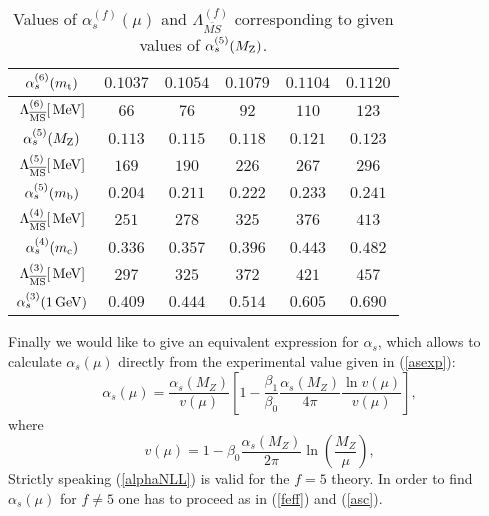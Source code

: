 \documentclass[12pt,rotate]{article}
\def\as{\alpha_s}
\newcommand{\mt}{m_{\rm t}}
\newcommand{\mc}{m_{\rm c}}
\newcommand{\mb}{m_{\rm b}}
\newcommand{\mz}{M_{\rm Z}}
\newcommand{\gev}{\, {\rm GeV}}
\newcommand{\mev}{\, {\rm MeV}}
\newcommand{\Lms}{\Lambda_{\overline{\rm MS}}}
\newcommand{\be}{\begin{equation}}
\newcommand{\ee}{\end{equation}}
\newcommand{\f}{\frac}
\begin{document}
\begin{itemize}
\begin{itemize}
\begin{table}[thb]
\caption[]{Values of $\alpha^{(f)}_s(\mu)$ and
$\Lambda^{(f)}_{\overline{MS}}$ corresponding to given values of
$\alpha_s^{(5)}(\mz)$.
\label{tab:alphas}}
\begin{center}
\begin{tabular}{|c|c|c|c|c|c|}\hline
 $\alpha_s^{(6)}(\mt)$& $0.1037$& $0.1054$& $0.1079$ & $0.1104$ &  $0.1120$ 
\\ \hline
 $\Lms^{(6)}[\mev]$& $66$& $76$& $92$ & $110$ &  $123$ 
\\ \hline\hline
 $\alpha_s^{(5)}(\mz)$& $0.113$& $0.115$& $0.118$ & $0.121$ &  $0.123$ 
\\ \hline
 $\Lms^{(5)}[\mev]$& $169$& $190$& $226$ & $267$ &  $296$ 
\\ \hline
 $\alpha_s^{(5)}(\mb)$& $0.204$& $0.211$& $0.222$ & $0.233$ &  $0.241$ 
\\ \hline\hline
 $\Lms^{(4)}[\mev]$& $251$& $278$& $325$ & $376$ &  $413$ 
\\ \hline
 $\alpha_s^{(4)}(\mc)$& $0.336$& $0.357$& $0.396$ & $0.443$ &  $0.482$ 
\\ \hline\hline
 $\Lms^{(3)}[\mev]$& $297$& $325$& $372$ & $421$ &  $457$ 
\\ \hline
 $\alpha_s^{(3)}(1\gev)$& $0.409$& $0.444$& $0.514$ & $0.605$ &  $0.690$ 
\\ \hline
 \end{tabular}
\end{center}
\end{table}
Finally we would like to give an equivalent expression for $\alpha_s$,
which allows to calculate $\alpha_{s}(\mu)$ directly from
the experimental value given in (\ref{asexp}):
%
\be\label{alphaNLL}
\as(\mu) = \frac{\as(M_Z)}{v(\mu)} \left[1 - \f{\beta_1}{\beta_0} 
           \frac{\as(M_Z)}{4 \pi}    \f{\ln v(\mu)}{v(\mu)} \right],
\ee
%
where 
%
\be\label{v(mu)}
v(\mu) = 1 - \beta_0 \frac{\as(M_Z)}{2 \pi} 
\ln \left( \frac{M_Z}{\mu} \right),
\ee
Strictly speaking (\ref{alphaNLL}) is valid for the $f=5$ theory.
In order to find $\as(\mu)$ for $f\not=5$ one has to proceed as in
(\ref{feff}) and (\ref{asc}).

\end{itemize}
\end{itemize}
\end{document}
